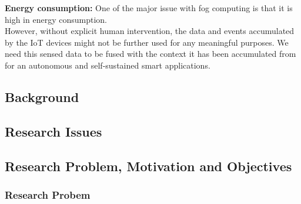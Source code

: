\documentclass[10pt]{llncs}
\begin{document}
\textbf{Energy consumption:} One of the major issue with fog computing is that it is high in energy consumption. \\

However, without explicit human intervention, the data and events accumulated by the IoT devices might not be further used for any meaningful purposes. We need this sensed data to be fused with the context it has been accumulated from for an autonomous and self-sustained smart applications.

%
\subsection{Background}



%

%

%

%


%
\subsection{Research Issues}


%


%


%


%
\subsection{Research Problem, Motivation and Objectives}

%
\subsubsection{Research Probem}

\end{document}
